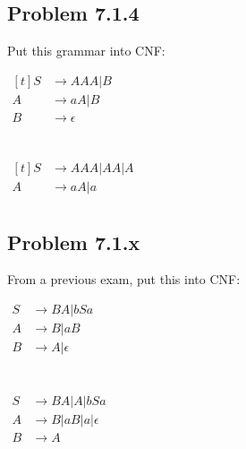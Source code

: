 \documentclass[12pt]{scrbook}
\begin{document}
\subsection*{Problem 7.1.4}Put this grammar into CNF:

$\begin{aligned}[t]
  S &\rightarrow AAA | B \\
  A &\rightarrow aA | B \\
  B &\rightarrow \epsilon
\end{aligned}$
\\\\\\
$\begin{aligned}[t]
  S &\rightarrow AAA | AA | A \\
  A &\rightarrow aA | a \\
\end{aligned}$


\subsection*{Problem 7.1.x}From a previous exam, put this into CNF:

$\begin{aligned}
 S &\rightarrow BA | bSa \\
 A &\rightarrow B | aB \\
 B &\rightarrow A | \epsilon
\end{aligned}$
\\\\\\
$\begin{aligned}
 S &\rightarrow BA | A | bSa \\
 A &\rightarrow B | aB | a | \epsilon \\
 B &\rightarrow A
\end{aligned}$
\end{document}
